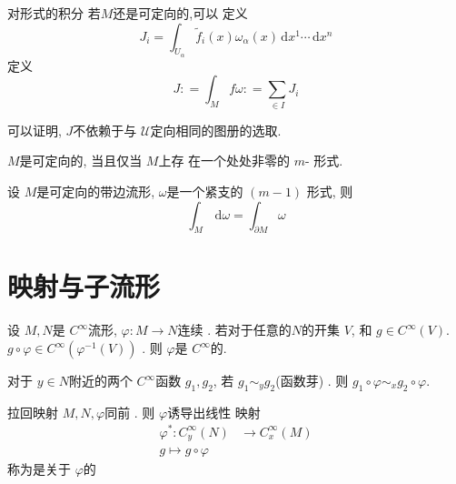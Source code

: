 \documentclass[../main.tex]{subfiles}
\begin{document}
\begin{definition}{对形式的积分}{}
若\(  M  \)还是可定向的,可以  定义 \[
  J_{i}= \int_{U_{\alpha }} \tilde{f}_{i}\left( x \right) \omega _{\alpha }\left( x \right)\,\mathrm{d} x^{1}\cdots \,\mathrm{d} x^{n}  
  \]定义 \[
  J: = \int_{M}f  \omega : =   \sum _{\in I}J_{i}
  \] 
\end{definition}
\begin{remark}
  可以证明, \(  J  \)不依赖于与 \(  \mathcal{U}  \)定向相同的图册的选取.   
\end{remark}

\begin{definition}{}{}
  \(  M  \)是可定向的, 当且仅当 \(  M  \)上存 在一个处处非零的 \(  m  \)- 形式.    
\end{definition}

\begin{theorem}{}{}
  设 \(  M  \)是可定向的带边流形, \(   \omega   \)是一个紧支的 \(  \left( m-1 \right)   \)   形式, 则 \[
  \int_{M}\,\mathrm{d}  \omega = \int_{ \partial M} \omega 
  \]
\end{theorem}

\section{映射与子流形}

\begin{lemma}{}{}
    设 \(  M,N  \)是 \(  C^{\infty}  \)流形, \(   \varphi :M\to N \)连续   . 若对于任意的\(  N  \)的开集 \(  V  \), 和 \(  g \in C^{\infty}\left( V \right)   \). \(  g\circ  \varphi \in C^{\infty}\left(  \varphi^{-1}\left( V \right)  \right)  \) . 则 \(   \varphi  \)是 \(  C^{\infty}  \)的.       
\end{lemma}
 
\begin{lemma}{}{}
    对于 \(  y \in N  \)附近的两个 \(  C^{\infty}  \)函数 \(  g_1,g_2  \), 若 \(  g_1\sim_{y}g_2  \)(函数芽) . 则 \(  g_1\circ  \varphi\sim_{x}g_2\circ  \varphi  \).     
\end{lemma}  

\begin{definition}{拉回映射}{}
    \(  M,N  , \varphi\)同前 . 则 \(   \varphi  \)诱导出线性  映射 \[
     \begin{aligned}
     \varphi ^{*}: C^{\infty}_{y}\left( N \right)&\to C^{\infty}_{x}\left( M \right)  \\ 
      g\mapsto  g\circ  \varphi
     \end{aligned}
    \]称为是关于 \(   \varphi  \)的 
\end{definition}
\end{document}
